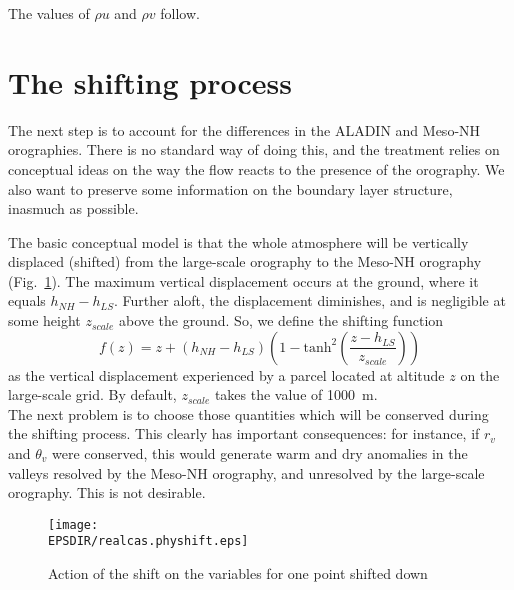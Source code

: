 The values of $\rho u$ and $\rho v$ follow.

\section{The shifting process}

The next step is to account for the differences in the ALADIN and Meso-NH
orographies. There is no standard way of doing this, and the treatment
relies on conceptual ideas on the way the flow reacts to the presence of
the orography. We also want to preserve some information on the boundary
layer structure, inasmuch as possible.

The basic conceptual model is that the whole atmosphere will be vertically
displaced (shifted) from the large-scale orography to the Meso-NH orography
(Fig.~\ref{physhift}). The maximum vertical
displacement occurs at the ground, where it equals $h_{NH}-h_{LS}$. Further
aloft, the displacement diminishes, and is negligible at some height
$z_{scale}$ above the ground. So, we define the shifting function
\begin{equation}
\label{shift}
f(z)=z+(h_{NH}-h_{LS})\left( 1-\mbox{tanh}^2
\left(\frac{z-h_{LS}}{z_{scale}}\right)\right)
\end{equation}
as the vertical displacement experienced by a parcel located at altitude
$z$ on the large-scale grid.
By default, $z_{scale}$ takes the value of 1000~m.\\

The next problem is to choose those quantities which will be conserved
during the shifting process. This clearly has important consequences: for
instance, if $r_v$ and $\theta_v$ were conserved, this would generate
warm and dry anomalies in the valleys resolved by the Meso-NH orography,
and unresolved by the large-scale orography. This is not desirable.

\clearpage


\begin{figure}[!ht]
\centerline{\texttt{[image: \\EPSDIR/realcas.physhift.eps]}}
\caption{Action of the shift on the variables for one point shifted down
\label{physhift}}
\end{figure}

\clearpage

